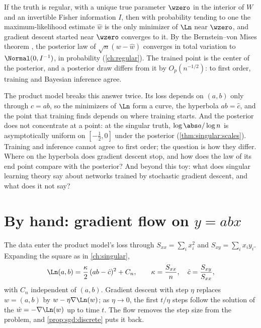 \begin{refsection}
\begin{regularanswer}
If the truth is regular, with a unique true parameter $\wzero$ in the interior of $W$ and an invertible Fisher information $I$, then with probability tending to one the maximum-likelihood estimate $\hat w$ is the only minimizer of $\Ln$ near $\wzero$, and gradient descent started near $\wzero$ converges to it. By the Bernstein--von Mises theorem \parencite[Theorem~10.1]{vanderVaart1998}, the posterior law of $\sqrt n(w-\hat w)$ converges in total variation to $\Normal(0,I^{-1})$, in probability (\cref{ch:regular}). The trained point is the center of the posterior, and a posterior draw differs from it by $O_p(n^{-1/2})$: to first order, training and Bayesian inference agree.
\end{regularanswer}

The product model breaks this answer twice. Its loss depends on $(a,b)$ only through $c=ab$, so the minimizers of $\Ln$ form a curve, the hyperbola $ab=\hat c$, and the point that training finds depends on where training starts. And the posterior does not concentrate at a point: at the singular truth, $\log\abs a/\log n$ is asymptotically uniform on $[-\frac12,0]$ under the posterior (\cref{thm:singular:scales}). Training and inference cannot agree to first order; the question is how they differ. Where on the hyperbola does gradient descent stop, and how does the law of its end point compare with the posterior? And beyond this toy: what does singular learning theory say about networks trained by stochastic gradient descent, and what does it not say?

\section{By hand: gradient flow on \texorpdfstring{$y=abx$}{y = abx}}\label{sec:sgd:byhand}

The data enter the product model's loss through $S_{xx}=\sum_ix_i^2$ and $S_{xy}=\sum_ix_iy_i$. Expanding the square as in \cref{ch:singular},
\begin{equation}\label{eq:sgd:loss}
\Ln(a,b)=\frac\kappa2\,(ab-\hat c)^2+C_n,\qquad\kappa=\frac{S_{xx}}n,\quad\hat c=\frac{S_{xy}}{S_{xx}},
\end{equation}
with $C_n$ independent of $(a,b)$. Gradient descent with step $\eta$ replaces $w=(a,b)$ by $w-\eta\nabla\Ln(w)$; as $\eta\to0$, the first $t/\eta$ steps follow the solution of the  $\dot w=-\nabla\Ln(w)$ up to time $t$. The flow removes the step size from the problem, and \cref{prop:sgd:discrete} puts it back.


\end{refsection}
